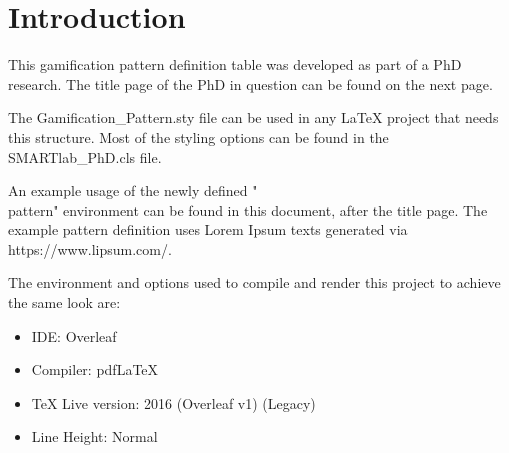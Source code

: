 \documentclass[]{SMARTlab_PhD}
\begin{document}

\chapter{Introduction}

This gamification pattern definition table was developed as part of a PhD research. The title page of the PhD in question can be found on the next page.

The Gamification\_Pattern.sty file can be used in any LaTeX project that needs this structure. Most of the styling options can be found in the SMARTlab\_PhD.cls file.

An example usage of the newly defined "\\pattern" environment can be found in this document, after the title page. The example pattern definition uses Lorem Ipsum texts generated via https://www.lipsum.com/.

The environment and options used to compile and render this project to achieve the same look are:

\begin{itemize}
    \item IDE: Overleaf
    \item Compiler: pdfLaTeX
    \item TeX Live version: 2016 (Overleaf v1) (Legacy)
    \item Line Height: Normal
\end{itemize}



\end{document}
